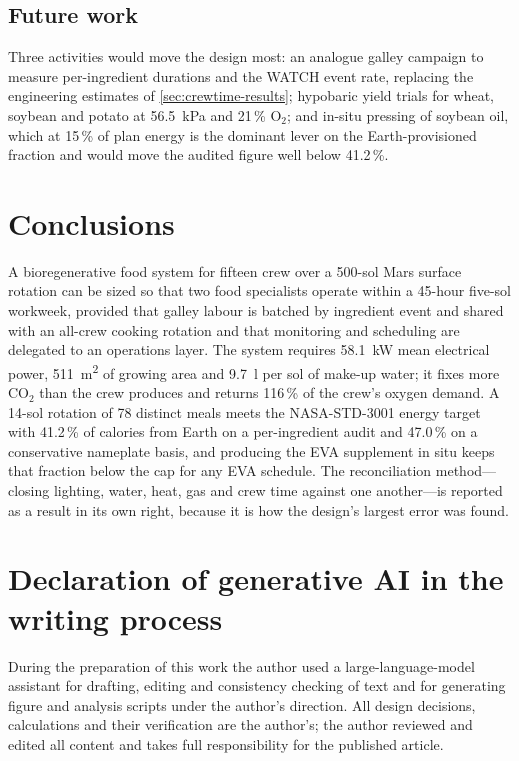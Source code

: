 \documentclass[11pt,a4paper,3p,authoryear]{elsarticle}
\begin{document}
\subsection{Future work}

Three activities would move the design most: an analogue galley campaign to measure per-ingredient durations and the WATCH event rate, replacing the engineering estimates of \cref{sec:crewtime-results}; hypobaric yield trials for wheat, soybean and potato at \SI{56.5}{\kilo\pascal} and 21\,\% O$_2$; and in-situ pressing of soybean oil, which at 15\,\% of plan energy is the dominant lever on the Earth-provisioned fraction and would move the audited figure well below 41.2\,\%.

\section{Conclusions}\label{sec:conclusions}

A bioregenerative food system for fifteen crew over a 500-sol Mars surface rotation can be sized so that two food specialists operate within a 45-hour five-sol workweek, provided that galley labour is batched by ingredient event and shared with an all-crew cooking rotation and that monitoring and scheduling are delegated to an operations layer. The system requires \SI{58.1}{\kilo\watt} mean electrical power, \SI{511}{\metre\squared} of growing area and \SI{9.7}{\litre} per sol of make-up water; it fixes more CO$_2$ than the crew produces and returns 116\,\% of the crew's oxygen demand. A 14-sol rotation of 78 distinct meals meets the NASA-STD-3001 energy target with 41.2\,\% of calories from Earth on a per-ingredient audit and 47.0\,\% on a conservative nameplate basis, and producing the EVA supplement in situ keeps that fraction below the cap for any EVA schedule. The reconciliation method---closing lighting, water, heat, gas and crew time against one another---is reported as a result in its own right, because it is how the design's largest error was found.

\section*{Declaration of generative AI in the writing process}
During the preparation of this work the author used a large-language-model assistant for drafting, editing and consistency checking of text and for generating figure and analysis scripts under the author's direction. All design decisions, calculations and their verification are the author's; the author reviewed and edited all content and takes full responsibility for the published article.
\end{document}
